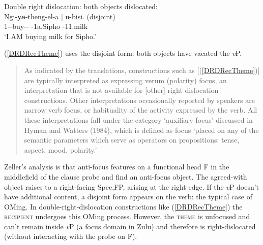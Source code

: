 \documentclass[output=paper]{langscibook}
\begin{document}
\begin{exe}

\ex Double right dislocation: both objects dislocated: \label{DRDRecTheme} \\
\gll Ngi-\textbf{ya}-theng-el-a {]}  u-bisi. (disjoint) \\
1\Sg-\Om-buy-\Appl-\Fv{} {} \Aug-1a.Sipho \Aug-11.milk \\
\glt `I AM buying milk for Sipho.’ 


\end{exe}
(\ref{DRDRecTheme}) uses the disjoint form: both objects have vacated the \textit{v}P. 

\begin{quote}
As indicated by the translations, constructions such as [(\ref{DRDRecTheme})] are typically interpreted as expressing verum (polarity) focus, an interpretation that is not available for [other] right dislocation constructions. Other interpretations occasionally reported by speakers are narrow verb focus, or habituality of the activity expressed by the verb. All these interpretations fall under the category `auxiliary focus’ discussed in Hyman and Watters (1984), which is defined as focus ‘placed on any of the semantic parameters which serve as operators on propositions: tense, aspect, mood, polarity.' \citep[236]{Zeller:2015:ZuluDrD}
\end{quote}

Zeller's analysis is that anti-focus features on a functional head F in the middlefield of the clause probe and find an anti-focus object. The agreed-with object raises to a right-facing Spec,FP, arising at the right-edge. If the \textit{v}P doesn't have additional content, a disjoint form appears on the verb: the typical case of OMing. In double-right-dislocation constructions like (\ref{DRDRecTheme}) the \textsc{recipient} undergoes this OMing process. However, the \textsc{theme} is unfocused and can't remain inside \textit{v}P (a focus domain in Zulu) and therefore is right-dislocated (without interacting with the probe on F).
\end{document}
